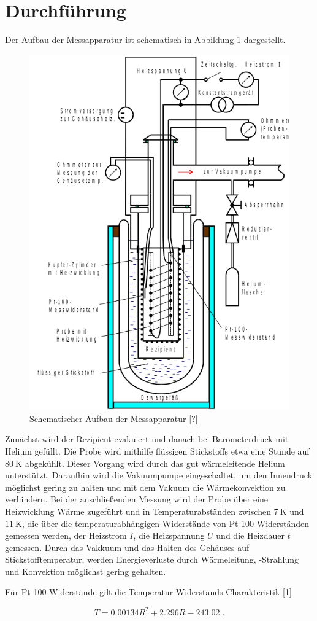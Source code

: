 \section{Durchführung}
\label{sec:Durchführung}

Der Aufbau der Messapparatur ist schematisch in Abbildung \ref{fig:aufbau} dargestellt.


\begin{figure}
    \centering
    \includegraphics[scale = 0.7]{content/plot2.png}
    \caption{Schematischer Aufbau der Messapparatur [?]}
    \label{fig:aufbau}
  \end{figure}


Zunächst wird der Rezipient evakuiert und danach bei Barometerdruck mit Helium gefüllt.
Die Probe wird mithilfe flüssigen Stickstoffs etwa eine Stunde auf $\SI{80}{\kelvin}$ abgekühlt.
Dieser Vorgang wird durch das gut wärmeleitende Helium unterstützt.
Daraufhin wird die Vakuumpumpe eingeschaltet, um den Innendruck möglichst gering zu halten und
mit dem Vakuum die Wärmekonvektion zu verhindern.
Bei der anschließenden Messung wird der Probe über eine Heizwicklung Wärme zugeführt und in 
Temperaturabständen zwischen $\SI{7}{\kelvin}$ und $\SI{11}{\kelvin}$, die über die temperaturabhängigen
 Widerstände von Pt-100-Widerständen gemessen werden, der Heizstrom $I$, die Heizspannung $U$ und die
 Heizdauer $t$ gemessen.
 Durch das Vakkuum und das Halten des Gehäuses auf Stickstofftemperatur, werden Energieverluste durch
 Wärmeleitung, -Strahlung und Konvektion möglichst gering gehalten.

Für Pt-100-Widerstände gilt die Temperatur-Widerstands-Charakteristik [1]

\begin{equation}
    \label{eqn:Temp}
    T = 0.00134 R^2 + 2.296 R - 243.02 \; .
\end{equation}

